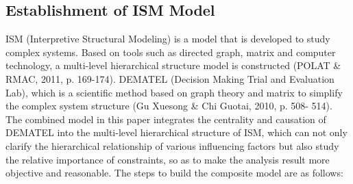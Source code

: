\documentclass[12pt]{article}  %
\begin{document}
\subsection{Establishment of ISM Model}
ISM (Interpretive Structural Modeling) is a model that is developed to study complex systems. 
Based on tools such as directed graph, matrix and computer technology, a multi-level 
hierarchical structure model is constructed (POLAT \& RMAC, 2011, p. 169-174). DEMATEL 
(Decision Making Trial and Evaluation Lab), which is a scientific method based on graph theory 
and matrix to simplify the complex system structure (Gu Xuesong \& Chi Guotai, 2010, p. 508-
514). The combined model in this paper integrates the centrality and causation of DEMATEL 
into the multi-level hierarchical structure of ISM, which can not only clarify the hierarchical 
relationship of various influencing factors but also study the relative importance of constraints, 
so as to make the analysis result more objective and reasonable.
The steps to build the composite model are as follows:
\end{document}
